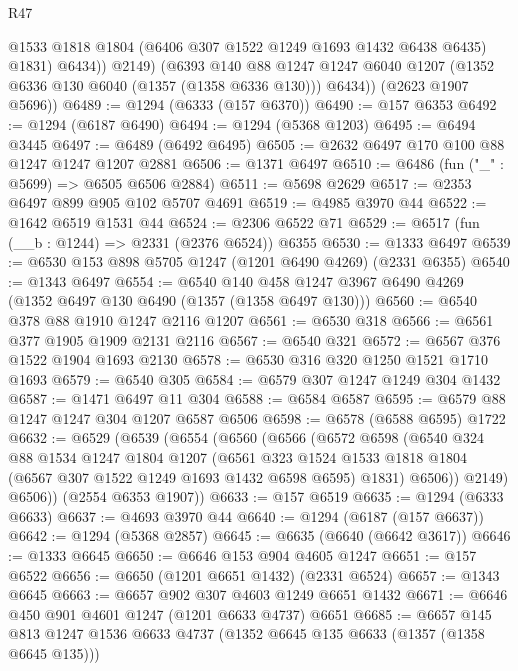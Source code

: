 \begin{lexlean}{R47}
\begin{coremodule}
                @1533
                @1818
                @1804
                (@6406 @307 @1522 @1249 @1693 @1432 @6438 @6435)
                @1831)
              @6434))
          @2149)
        (@6393
          @140
          @88
          @1247
          @1247
          @6040
          @1207
          (@1352 @6336 @130 @6040 (@1357 (@1358 @6336 @130)))
          @6434))
      (@2623 @1907 @5696))
@6489 := @1294 (@6333 (@157 @6370))
@6490 := @157 @6353
@6492 := @1294 (@6187 @6490)
@6494 := @1294 (@5368 @1203)
@6495 := @6494 @3445
@6497 := @6489 (@6492 @6495)
@6505 := @2632 @6497 @170 @100 @88 @1247 @1247 @1207 @2881
@6506 := @1371 @6497
@6510 := @6486 (fun ("_" : @5699) => @6505 @6506 @2884)
@6511 := @5698 @2629
@6517 := @2353 @6497 @899 @905 @102 @5707 @4691
@6519 := @4985 @3970 @44
@6522 := @1642 @6519 @1531 @44
@6524 := @2306 @6522 @71
@6529 := @6517 (fun (__b : @1244) => @2331 (@2376 @6524)) @6355
@6530 := @1333 @6497
@6539 := @6530 @153 @898 @5705 @1247 (@1201 @6490 @4269) (@2331 @6355)
@6540 := @1343 @6497
@6554 := @6540 @140 @458 @1247 @3967 @6490 @4269 (@1352 @6497 @130 @6490 (@1357 (@1358 @6497 @130)))
@6560 := @6540 @378 @88 @1910 @1247 @2116 @1207
@6561 := @6530 @318
@6566 := @6561 @377 @1905 @1909 @2131 @2116
@6567 := @6540 @321
@6572 := @6567 @376 @1522 @1904 @1693 @2130
@6578 := @6530 @316 @320 @1250 @1521 @1710 @1693
@6579 := @6540 @305
@6584 := @6579 @307 @1247 @1249 @304 @1432
@6587 := @1471 @6497 @11 @304
@6588 := @6584 @6587
@6595 := @6579 @88 @1247 @1247 @304 @1207 @6587 @6506
@6598 := @6578 (@6588 @6595) @1722
@6632 := @6529
    (@6539
      (@6554
        (@6560
          (@6566
            (@6572
              @6598
              (@6540
                @324
                @88
                @1534
                @1247
                @1804
                @1207
                (@6561
                  @323
                  @1524
                  @1533
                  @1818
                  @1804
                  (@6567 @307 @1522 @1249 @1693 @1432 @6598 @6595)
                  @1831)
                @6506))
            @2149)
          @6506))
      (@2554 @6353 @1907))
@6633 := @157 @6519
@6635 := @1294 (@6333 @6633)
@6637 := @4693 @3970 @44
@6640 := @1294 (@6187 (@157 @6637))
@6642 := @1294 (@5368 @2857)
@6645 := @6635 (@6640 (@6642 @3617))
@6646 := @1333 @6645
@6650 := @6646 @153 @904 @4605 @1247
@6651 := @157 @6522
@6656 := @6650 (@1201 @6651 @1432) (@2331 @6524)
@6657 := @1343 @6645
@6663 := @6657 @902 @307 @4603 @1249 @6651 @1432
@6671 := @6646 @450 @901 @4601 @1247 (@1201 @6633 @4737) @6651
@6685 := @6657 @145 @813 @1247 @1536 @6633 @4737 (@1352 @6645 @135 @6633 (@1357 (@1358 @6645 @135)))

\end{coremodule}
\end{lexlean}
